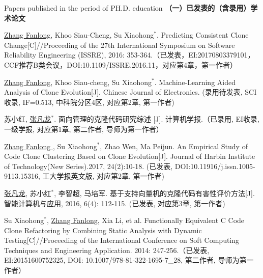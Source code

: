 
 {Papers
published in the period of PH.D. education}
\noindent\textbf{（一）已发表的（含录用）学术论文}
\begin{publist}

\item
\underline{Zhang Fanlong}, Khoo Siau-Cheng, Su Xiaohong{$^*$}. Predicting Consistent Clone Change[C]//Proceeding of the 27th International Symposium on Software Reliability Engineering (ISSRE), 2016: 353-364.（已发表，EI:20170803379101，CCF推荐B类会议，DOI:10.1109/ISSRE.2016.11，对应第4章，第一作者）
\item
\underline{Zhang Fanlong}, Khoo Siau-cheng, Su Xiaohong{$^*$}. Machine-Learning Aided Analysis of Clone Evolution[J]. Chinese Journal of Electronics. (录用待发表, SCI收录, IF=0.513, 中科院分区4区, 对应第2章, 第一作者)

\item 
苏小红, \underline{张凡龙}{$^*$}. 面向管理的克隆代码研究综述 [J]. 计算机学报.（已录用, EI收录, 一级学报, 对应第1章, 第二作者, 导师为第一作者）

\item
\underline{Zhang Fanlong }, Su Xiaohong{$^*$},  Zhao Wen,  Ma Peijun. An Empirical Study of Code Clone Clustering Based on Clone Evolution[J]. Journal of Harbin Institute of Technology(New Series).2017, 24(2):10-18. (已发表, DOI:10.11916/j.issn.1005-9113.15316, 工大学报英文版, 对应第2章, 第一作者)

\item
\underline{张凡龙}, 苏小红{$^*$},  李智超,  马培军. 基于支持向量机的克隆代码有害性评价方法[J]. 智能计算机与应用, 2016, 6(4): 112-115. (已发表, 对应第3章, 第一作者)

\item
Su Xiaohong{$^*$}, \underline{Zhang Fanlong},  Xia Li, et al. Functionally Equivalent C Code Clone Refactoring by Combining Static Analysis with Dynamic Testing[C]//Proceeding of the International Conference on Soft Computing Techniques and Engineering Application. 2014: 247-256.（已发表, EI:20151600752325, DOI: 10.1007/978-81-322-1695-7\_28, 第二作者, 导师为第一作者）
\end{publist}

